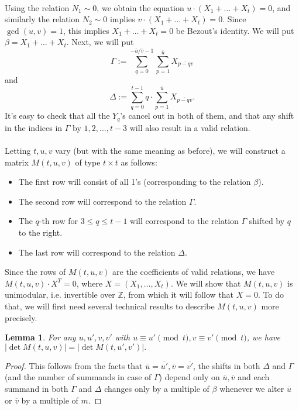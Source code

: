 \documentclass[12pt,a4paper]{article}
\newtheorem{lemma}[theorem]{Lemma}
\newcommand{\Z}{\mathbb{Z}}
\newcommand{\uo}{\overline{u}}
\newcommand{\vo}{\overline{v}}
\begin{document}
\paragraph*{}
Using the relation $N_1\sim 0$, we obtain the equation $u\cdot (X_1+\dots+X_t)=0$, and similarly the relation $N_2\sim 0$ implies $v\cdot (X_1+\dots+X_t)=0$. Since $\gcd(u,v)=1$, this implies $X_1+\dots+X_t=0$ be Bezout's identity. We will put $\beta=X_1+\dots+X_t$.
Next, we will put $$\Gamma:=\sum_{q=0}^{-\uo/\vo-1}\sum_{p=1}^{\uo}X_{\overline{p-qv}}$$
and $$\Delta:=\sum_{q=0}^{t-1}q\cdot\sum_{p=1}^{\uo}X_{\overline{p-qv}}.$$
It's easy to check that all the $Y_q$'s cancel out in both of them, and that any shift in the indices in $\Gamma$ by $1,2,\dots,t-3$ will also result in a valid relation.
\paragraph*{}
Letting $t,u,v$ vary (but with the same meaning as before), we will construct a matrix $M(t,u,v)$ of type $t\times t$ as follows:
\begin{itemize}
\item The first row will consist of all 1's (corresponding to the relation $\beta$).
\item The second row will correspond to the relation $\Gamma$.
\item The $q$-th row for $3\leq q\leq t-1$ will correspond to the relation $\Gamma$ shifted by $q$ to the right.
\item The last row will correspond to the relation $\Delta$.
\end{itemize}

Since the rows of $M(t,u,v)$ are the coefficients of valid relations, we have $M(t,u,v)\cdot X^T=0$, where $X=(X_1,\dots,X_t)$. We will show that $M(t,u,v)$ is unimodular, i.e. invertible over $\Z$, from which it will follow that $X=0$. To do that, we will first need several technical results to describe $M(t,u,v)$ more precisely.

\begin{lemma}
For any $u,u',v,v'$ with $u\equiv u'\pmod{t}, v\equiv v'\pmod{t}$, we have $|\det M(t,u,v)|=|\det M(t,u',v')|.$
\end{lemma}
\begin{proof}
This follows from the facts that $\uo=\overline{u'}, \vo=\overline{v'}$, the shifts in both $\Delta$ and $\Gamma$ (and the number of summands in case of $\Gamma$) depend only on $\uo,\vo$ and each summand in both $\Gamma$ and $\Delta$ changes only by a multiple of $\beta$ whenever we alter $\uo$ or $\vo$ by a multiple of $m$.
\end{proof}
\end{document}
